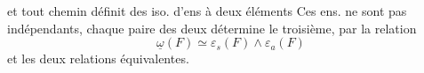 et tout chemin  définit des iso. d'ens à deux éléments
Ces ens. ne sont pas indépendants, chaque paire des deux détermine le troisième, par la relation
\[\underline\omega(F)\simeq\varepsilon_s(F)\wedge\varepsilon_a(F)\]
et les deux relations  équivalentes.

